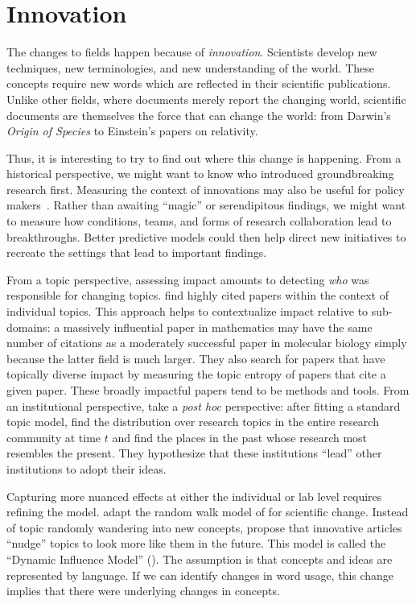 
\section{Innovation}

The changes to fields happen because of \emph{innovation}.  Scientists develop
new techniques, new terminologies, and new understanding of the world.  These
concepts require new words which are reflected in their scientific
publications.  Unlike other fields, where documents merely report the changing
world, scientific documents are themselves the force that can change the world:
from Darwin's \textit{Origin of Species} to Einstein's papers on relativity.

Thus, it is interesting to try to find out where this change is happening.  From
a historical perspective, we might want to know who introduced
groundbreaking research first.  Measuring the context of innovations may also be useful for policy makers~\citep{largent-12}.
Rather than awaiting ``magic'' or serendipitous findings, we might want to measure
how conditions, teams, and forms of research collaboration lead to breakthroughs.
Better predictive models could then help direct new initiatives to recreate the settings that lead to important findings.

From a topic perspective, assessing impact amounts to detecting \emph{who} was responsible
for changing topics.
\citet{mann-06} find highly cited papers within the context of individual topics.
This approach helps to contextualize impact relative to sub-domains: a massively influential paper in mathematics may have the same number of citations as a moderately successful paper in molecular biology simply because the latter field is much larger.
They also search for papers that have topically diverse impact by measuring the topic entropy of papers that cite a given paper.
These broadly impactful papers tend to be methods and tools.
From an institutional perspective, \citet{ramage-10} take
a \textit{post hoc} perspective: after fitting a standard  topic model,
find the distribution over research topics in the entire research community at
time $t$ and find the places in the past whose research most resembles the present.  They hypothesize that these institutions ``lead'' other institutions to adopt
their ideas. %

Capturing more nuanced effects at either the individual or lab level requires
refining the model.  \citet{gerrish-10} adapt the random walk model of
\citet{wang-08} for scientific change.  Instead of topic randomly wandering into
new concepts, \citet{gerrish-10} propose that innovative articles ``nudge'' topics
to look more like them in the future.  This model is called the ``Dynamic
Influence Model'' (). The assumption is that concepts and ideas are represented
by language. If we can identify changes in word usage, this change implies that there
were underlying changes in concepts.

